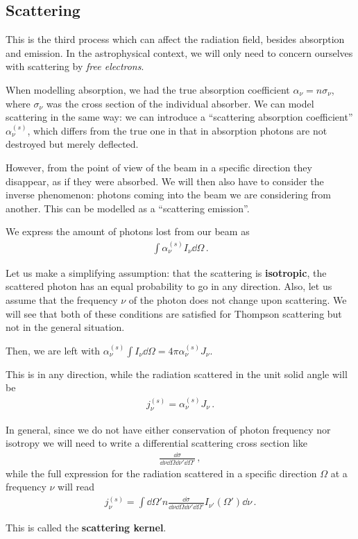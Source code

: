 \documentclass[main.tex]{subfiles}
\begin{document}
\subsection{Scattering}

This is the third process which can affect the radiation field, besides absorption and emission. 
In the astrophysical context, we will only need to concern ourselves with scattering by \emph{free electrons}. 

When modelling absorption, we had the true absorption coefficient \(\alpha_{\nu } = n \sigma_{\nu }\), where \(\sigma_{\nu }\) was the cross section of the individual absorber. 
We can model scattering in the same way: we can introduce a ``scattering absorption coefficient'' \(\alpha_{\nu}^{(s)}\), which differs from the true one in that in absorption photons are not destroyed but merely deflected. 

However, from the point of view of the beam in a specific direction they disappear, as if they were absorbed. 
We will then also have to consider the inverse phenomenon: photons coming into the beam we are considering from another. 
This can be modelled as a ``scattering emission''. 

We express the amount of photons lost from our beam as 
%
\begin{align}
\int \alpha^{(s)}_{\nu } I_\nu \dd{\Omega }
\,.
\end{align}

Let us make a simplifying assumption: that the scattering is \textbf{isotropic}, the scattered photon has an equal probability to go in any direction. Also, let us assume that the frequency \(\nu \) of the photon does not change upon scattering. 
We will see that both of these conditions are satisfied for Thompson scattering but not in the general situation. 

Then, we are left with \(\alpha_{\nu }^{(s)} \int I_\nu \dd{\Omega } = 4 \pi \alpha_{\nu }^{(s)} J_\nu \). 

This is in any direction, while the radiation scattered in the unit solid angle will be 
%
\begin{align}
j_{\nu }^{(s)} = \alpha_{\nu }^{(s)} J_\nu 
\,.
\end{align}

In general, since we do not have either conservation of photon frequency nor isotropy we will need to write a differential scattering cross section like 
%
\begin{align}
\frac{ \dd{\sigma }}{ \dd{\nu } \dd{\Omega } \dd{\nu}' \dd{\Omega }'}
\,,
\end{align}
%
while the full expression for the radiation scattered in a specific direction \(\Omega \) at a frequency \(\nu \) will read 
%
\begin{align}
j_\nu^{(s)} = \int \dd{\Omega}' n \frac{ \dd{\sigma }}{ \dd{\nu } \dd{\Omega } \dd{\nu}' \dd{\Omega }'} I_{\nu'} (\Omega') \dd{\nu }
\,. 
\end{align}

This is called the \textbf{scattering kernel}. 
\end{document}
